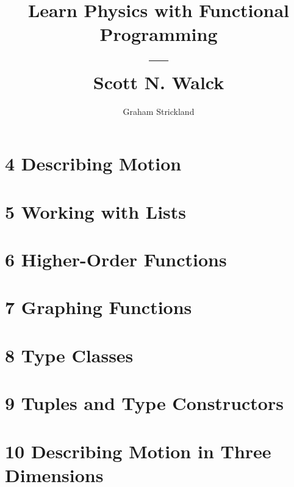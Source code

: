 \documentclass{article}
\title{Learn Physics with Functional Programming\\---\\Scott N. Walck}
\author{Graham Strickland}
\numberwithin{figure}{section}
\numberwithin{equation}{section}
\begin{document}
\maketitle  

\section*{4 Describing Motion}


\section*{5 Working with Lists}


\section*{6 Higher-Order Functions}


\section*{7 Graphing Functions}


\section*{8 Type Classes}


\section*{9 Tuples and Type Constructors}


\section*{10 Describing Motion in Three Dimensions}

\end{document}
